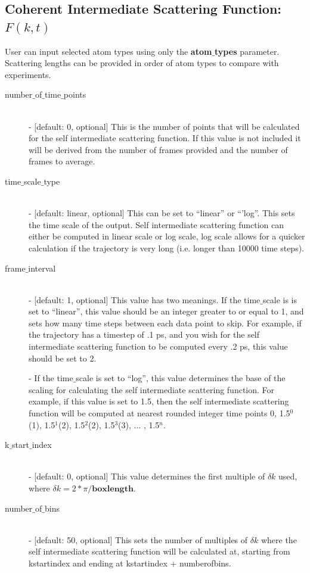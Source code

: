 \documentclass{article}
\begin{document}
\subsection{Coherent Intermediate Scattering Function: $F(k,t)$} \label{sec::Fqt_parm}
User can input selected atom types using only the \textbf{atom$\_$types} parameter. Scattering lengths can be provided in order of atom types to compare with experiments.
\begin{description}	
	\item[number$\_$of$\_$time$\_$points]\hfill \\
	- [default: 0, optional] This is the number of points that will be calculated for the self intermediate scattering function.  If this value is not included it will be derived from the number of frames provided and the number of frames to average.
	
	\item[time$\_$scale$\_$type] \hfill \\
	- [default: linear, optional] This can be set to ``linear'' or ``'log''.  This sets the time scale of the output. Self intermediate scattering function can either be computed in linear scale or log scale, log scale allows for a quicker calculation if the trajectory is very long (i.e. longer than 10000 time steps).
	
	\item[frame$\_$interval] \hfill \\
	- [default: 1, optional] This value has two meanings.  If the time$\_$scale is is set to ``linear'', this value should be an integer greater to or equal to 1, and sets how many time steps between each data point to skip.  For example, if the trajectory has a timestep of .1 ps, and you wish for the self intermediate scattering function to be computed every .2 ps, this value should be set to 2. 
	
	- If the time$\_$scale is set to ``log'', this value determines the base of the scaling for calculating the self intermediate scattering function.  For example, if this value is set to 1.5, then the self intermediate scattering function will be computed at nearest rounded integer time points 0, 1.5$^0$(1), 1.5$^1$(2), 1.5$^2$(2), 1.5$^3$(3), ... , 1.5$^{n}$.
	
	\item[k$\_$start$\_$index] \hfill \\
	- [default: 0, optional] This value determines the first multiple of $\delta k$ used, where $\delta k = 2*\pi/\textbf{boxlength}$.  
	
	\item[number$\_$of$\_$bins] \hfill \\
	- [default: 50, optional] This sets the number of multiples of $\delta k$ where the self intermediate scattering function will be calculated at, starting from kstartindex and ending at kstartindex + numberofbins.
	
\end{description}
\end{document}
